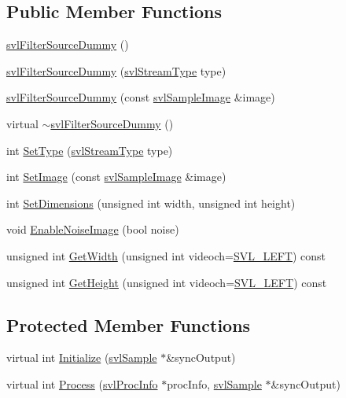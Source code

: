 \subsection*{Public Member Functions}
\begin{DoxyCompactItemize}
\item 
\hyperlink{classsvl_filter_source_dummy_a11e058fdc93020c012e337ccf294d321}{svl\+Filter\+Source\+Dummy} ()
\item 
\hyperlink{classsvl_filter_source_dummy_abf72e1d11e496e7da798ed1a4a165d47}{svl\+Filter\+Source\+Dummy} (\hyperlink{svl_definitions_8h_aa00696d338a58db361335a01fd11e122}{svl\+Stream\+Type} type)
\item 
\hyperlink{classsvl_filter_source_dummy_a77dba4b35b700f31e7f68d8394d9c265}{svl\+Filter\+Source\+Dummy} (const \hyperlink{classsvl_sample_image}{svl\+Sample\+Image} \&image)
\item 
virtual \hyperlink{classsvl_filter_source_dummy_aed008e8a627fe2926024e79da4642b11}{$\sim$svl\+Filter\+Source\+Dummy} ()
\item 
int \hyperlink{classsvl_filter_source_dummy_ab24ce2dea1b0c224db443e39efbad990}{Set\+Type} (\hyperlink{svl_definitions_8h_aa00696d338a58db361335a01fd11e122}{svl\+Stream\+Type} type)
\item 
int \hyperlink{classsvl_filter_source_dummy_ab1067ded15081294b7ed9f647e382090}{Set\+Image} (const \hyperlink{classsvl_sample_image}{svl\+Sample\+Image} \&image)
\item 
int \hyperlink{classsvl_filter_source_dummy_a15dbb9f869bfc8af55a511d23ceb9b70}{Set\+Dimensions} (unsigned int width, unsigned int height)
\item 
void \hyperlink{classsvl_filter_source_dummy_a162a0ea899d8a72bdfeddd3cb5665d6e}{Enable\+Noise\+Image} (bool noise)
\item 
unsigned int \hyperlink{classsvl_filter_source_dummy_a4299d59d573323dd0500bb1fd0e983d5}{Get\+Width} (unsigned int videoch=\hyperlink{svl_definitions_8h_ab9fec7615f19c8df2919eebcab0b187f}{S\+V\+L\+\_\+\+L\+E\+F\+T}) const 
\item 
unsigned int \hyperlink{classsvl_filter_source_dummy_afc465b16cb81c66305c4b534f9c78d2f}{Get\+Height} (unsigned int videoch=\hyperlink{svl_definitions_8h_ab9fec7615f19c8df2919eebcab0b187f}{S\+V\+L\+\_\+\+L\+E\+F\+T}) const 
\end{DoxyCompactItemize}
\subsection*{Protected Member Functions}
\begin{DoxyCompactItemize}
\item 
virtual int \hyperlink{classsvl_filter_source_dummy_a38f36ee210331e0e1ce3cca9b845bb56}{Initialize} (\hyperlink{classsvl_sample}{svl\+Sample} $\ast$\&sync\+Output)
\item 
virtual int \hyperlink{classsvl_filter_source_dummy_afcb9927324723b79a86d695e788ffb4c}{Process} (\hyperlink{structsvl_proc_info}{svl\+Proc\+Info} $\ast$proc\+Info, \hyperlink{classsvl_sample}{svl\+Sample} $\ast$\&sync\+Output)
\end{DoxyCompactItemize}
